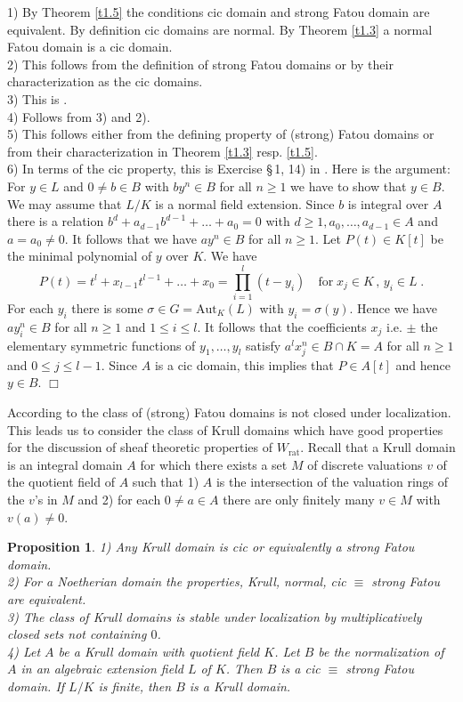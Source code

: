 \documentclass[12pt,leqno]{article}
\newcommand{\Aut}{\mathrm{Aut}}
\newcommand{\rat}{\mathrm{rat}}
\newtheorem{prop}[theorem]{Proposition}
\newenvironment{proof}{\noindent {\bf Proof}}{\mbox{}\hspace*{\fill}$\Box$}
\begin{document}
\begin{proof}
1) By Theorem \ref{t1.5} the conditions cic domain and strong Fatou domain are equivalent. By definition cic domains are normal. By Theorem \ref{t1.3} a normal Fatou domain is a cic domain.\\
2) This follows from the definition of strong Fatou domains or by their characterization as the cic domains.\\
3) This is \cite[Proposition 4]{B}.\\
4) Follows from 3) and 2).\\
5) 
This follows either from the defining property of (strong) Fatou domains or from their characterization in Theorem \ref{t1.3} resp. \ref{t1.5}. \\
6) In terms of the cic property, this is Exercise \S\,1, 14) in \cite{Bou}. Here is the argument: For $y \in L$ and $0 \neq b \in B$ with $by^n \in B$ for all $n \ge 1$ we have to show that $y \in B$. We may assume that $L / K$ is a normal field extension. Since $b$ is integral over $A$ there is a relation $b^d + a_{d-1} b^{d-1} + \ldots + a_0 = 0$ with $d \ge 1 , a_0 , \ldots , a_{d-1} \in A$ and $a = a_0 \neq 0$. It follows that we have $ay^n \in B$ for all $n \ge 1$. Let $P (t) \in K [t]$ be the minimal polynomial of $y$ over $K$. We have
\[
P (t) = t^l + x_{l-1} t^{l-1} + \ldots + x_0 = \prod^l_{i=1} (t - y_i) \quad \text{for} \; x_j \in K \, , \, y_i \in L \; .
\]
For each $y_i$ there is some $\sigma \in G = \Aut_K (L)$ with $y_i = \sigma (y)$. Hence we have $ay^n_i \in B$ for all $n \ge 1$ and $1 \le i \le l$. It follows that the coefficients $x_j$ i.e. $\pm$ the elementary symmetric functions of $y_1 , \ldots , y_l$ satisfy $a^l x^n_j \in B \cap K = A$ for all $n \ge 1$ and $0 \le j \le l-1$. Since $A$ is a cic domain, this implies that $P \in A [t]$ and hence $y \in B$. 
\end{proof}

According to \cite{C1} the class of (strong) Fatou domains is not closed under localization. This leads us to consider the class of Krull domains which have good properties for the discussion of sheaf theoretic properties of $W_{\rat}$. Recall that a Krull domain is an integral domain $A$ for which there exists a set $M$ of discrete valuations $v$ of the quotient field of $A$ such that 1) $A$ is the intersection of the valuation rings of the $v$'s in $M$ and 2) for each $0 \neq a \in A$ there are only finitely many $v \in M$ with $v (a) \neq 0$.

\begin{prop}
\label{t1.6}
1) Any Krull domain is cic or equivalently a strong Fatou domain.\\
2) For a Noetherian domain the properties, Krull, normal, cic $\equiv$ strong Fatou are equivalent.\\
3) The class of Krull domains is stable under localization by multiplicatively closed sets not containing $0$.\\
4) Let $A$ be a Krull domain with quotient field $K$. Let $B$ be the normalization of $A$ in an algebraic extension field $L$ of $K$. Then $B$ is a cic $\equiv$ strong Fatou domain. If $L / K$ is finite, then $B$ is a Krull domain.
\end{prop}
\end{document}
